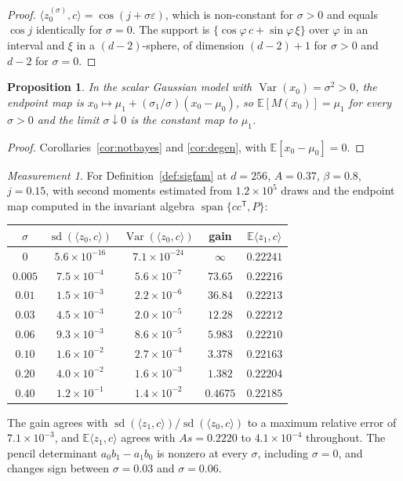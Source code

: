 \documentclass[11pt]{article}
\newtheorem{proposition}[lemma]{Proposition}
\theoremstyle{definition}
\theoremstyle{remark}
\newtheorem{measurement}[lemma]{Measurement}
\DeclareMathOperator{\Var}{Var}
\DeclareMathOperator{\spn}{span}
\DeclareMathOperator{\sd}{sd}
\newcommand{\E}{\mathbb{E}}
\newcommand{\T}{\mathsf{T}}
\begin{document}
\begin{proof}
$\langle z_0^{(\sigma)},c\rangle=\cos(j+\sigma\varepsilon)$, which is non-constant for $\sigma>0$
and equals $\cos j$ identically for $\sigma=0$. The support is
$\{\cos\varphi\,c+\sin\varphi\,\xi\}$ over $\varphi$ in an interval and $\xi$ in a $(d-2)$-sphere,
of dimension $(d-2)+1$ for $\sigma>0$ and $d-2$ for $\sigma=0$.
\end{proof}

\begin{proposition}\label{prop:sigmean}
In the scalar Gaussian model with $\Var(x_0)=\sigma^{2}>0$, the endpoint map is
$x_0\mapsto\mu_1+(\sigma_1/\sigma)(x_0-\mu_0)$, so $\E[M(x_0)]=\mu_1$ for every $\sigma>0$ and the
limit $\sigma\downarrow0$ is the constant map to $\mu_1$.
\end{proposition}

\begin{proof}
Corollaries~\ref{cor:notbayes} and \ref{cor:degen}, with $\E[x_0-\mu_0]=0$.
\end{proof}

\begin{measurement}\label{meas:sigflat}
For Definition~\ref{def:sigfam} at $d=256$, $A=0.37$, $\beta=0.8$, $j=0.15$, with second moments
estimated from $1.2\times10^{5}$ draws and the endpoint map computed in the invariant algebra
$\spn\{cc^{\T},P\}$:
\begin{center}
\begin{tabular}{ccccc}
\toprule
$\sigma$ & $\sd(\langle z_0,c\rangle)$ & $\Var(\langle z_0,c\rangle)$ & gain & $\E\langle z_1,c\rangle$\\
\midrule
$0$     & $5.6\times10^{-16}$ & $7.1\times10^{-24}$ & $\infty$ & $0.22241$\\
$0.005$ & $7.5\times10^{-4}$  & $5.6\times10^{-7}$  & $73.65$  & $0.22216$\\
$0.01$  & $1.5\times10^{-3}$  & $2.2\times10^{-6}$  & $36.84$  & $0.22213$\\
$0.03$  & $4.5\times10^{-3}$  & $2.0\times10^{-5}$  & $12.28$  & $0.22212$\\
$0.06$  & $9.3\times10^{-3}$  & $8.6\times10^{-5}$  & $5.983$  & $0.22210$\\
$0.10$  & $1.6\times10^{-2}$  & $2.7\times10^{-4}$  & $3.378$  & $0.22163$\\
$0.20$  & $4.0\times10^{-2}$  & $1.6\times10^{-3}$  & $1.382$  & $0.22204$\\
$0.40$  & $1.2\times10^{-1}$  & $1.4\times10^{-2}$  & $0.4675$ & $0.22185$\\
\bottomrule
\end{tabular}
\end{center}
The gain agrees with $\sd(\langle z_1,c\rangle)/\sd(\langle z_0,c\rangle)$ to a maximum relative
error of $7.1\times10^{-3}$, and $\E\langle z_1,c\rangle$ agrees with $As=0.2220$ to
$4.1\times10^{-4}$ throughout. The pencil determinant $a_0b_1-a_1b_0$ is nonzero at every
$\sigma$, including $\sigma=0$, and changes sign between $\sigma=0.03$ and $\sigma=0.06$.
\end{measurement}
\end{document}

